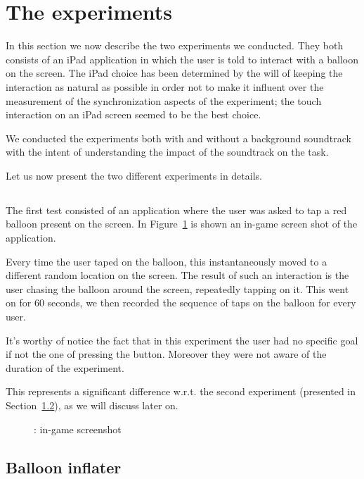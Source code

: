 \section{The experiments}
In this section we now describe the two experiments we conducted. They both consists of an iPad application in which the user is told to interact with a balloon on the screen. The iPad choice has been determined by the will of keeping the interaction as natural as possible in order not to make it influent over the measurement of the synchronization aspects of the experiment; the touch interaction on an iPad screen seemed to be the best choice.

We conducted the experiments both with and without a background soundtrack with the intent of understanding the impact of the soundtrack on the task.

Let us now present the two different experiments in details.

\subsection{\testfirst}
\label{sec:test1}
The first test consisted of an application where the user was asked to tap a red balloon present on the screen. In Figure~\ref{fig:test1} is shown an in-game screen shot of the application.

Every time the user taped on the balloon, this instantaneously moved to a different random location on the screen. The result of such an interaction is the user chasing the balloon around the screen, repeatedly tapping on it. This went on for 60 seconds, we then recorded the sequence of taps on the balloon for every user.

It's worthy of notice the fact that in this experiment the user had no specific goal if not the one of pressing the button. Moreover they were not aware of the duration of the experiment.

This represents a significant difference w.r.t. the second experiment (presented in Section~\ref{sec:test2}), as we will discuss later on.

\begin{figure}[h!t]
\label{fig:test1}
\centering
	{\setlength{\fboxsep}{0pt}
	 }
\caption{\testfirst: in-game screenshot}
\end{figure}

\subsection{Balloon inflater}
\label{sec:test2}
{\color{Gray}{\lipsum[7-10]}}